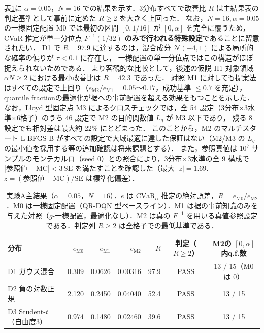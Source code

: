 \documentclass[a4paper,10pt]{jsarticle}
\theoremstyle{definition}
\newcommand{\CVaR}{\mathrm{CVaR}}
\newcommand{\Finv}{F^{-1}}
\begin{document}
表\ref{tab:A1}に $\alpha=0.05$，$N=16$ での結果を示す．3分布すべてで改善比 $R$ は主結果表の判定基準として事前に定めた $R\ge2$ を大きく上回った．
なお，$N=16, \alpha=0.05$ の一様固定配置 M0 では最初の区間 $[0, 1/16]$ が $[0, \alpha]$ を完全に覆うため，CVaR 推定が単一分位点 $\Finv(1/32)$ \textbf{のみで行われる特殊設定}であることに留意されたい．
D1 で $R=97.9$ に達するのは，混合成分 $\mathcal N(-4,1)$ による局所的な確率の偏りが $\tau<0.1$ に存在し，
一様配置の単一分位点ではこの構造がほぼ捉えられないためである．
より客観的な比較として，後述の仮説 H1 対象領域 $\alpha N\ge2$ における最小改善比は $R=42.3$ であった．
対照 M1 に対しても提案法はすべての設定で上回り（$e_{\mathrm{M2}}/e_{\mathrm{M1}}=0.05$〜$0.17$，成功基準 $\le0.7$ を充足），
quantile fractionの最適化が裾への事前配置を超える効果をもつことを示した．
なお，Lloyd 型固定点 M3 によるクロスチェックでは，全 54 設定（3分布$\times$3水準$\times$6格子）のうち 46 設定で M2 の目的関数値 $L_g$ が M3 以下であり，
残る 8 設定でも相対差は最大約 22\% にとどまった．
このことから，M2 のマルチスタート L-BFGS-B がすべての設定で大域最適に達した保証はない（M2/M3 の $L_g$ の最小値を採用する等の追加確認は将来課題とする）．
また，参照真値は $10^7$ サンプルのモンテカルロ（seed 0）との照合により，3分布$\times$3水準の全 9 構成で
$|\text{参照値}-\text{MC}|<3\,\mathrm{SE}$ を満たすことを確認した（最大 $|z|=1.69$. $z=(\text{参照値}-\text{MC})/\mathrm{SE}$ は標準化偏差）．

\begin{table}[htbp]
\centering
\caption{実験A主結果（$\alpha=0.05$，$N=16$）．$e$ は $\CVaR_\alpha$ 推定の絶対誤差，$R=e_{\mathrm{M0}}/e_{\mathrm{M2}}$．M0 は一様固定配置（QR-DQN 型ベースライン）．M1 は裾の事前知識のみを与えた対照（$g$-一様配置，最適化なし）．M2 は真の $\Finv$ を用いる真値参照設定である．判定列 $R\ge2$ は全格子での最低基準である．}
\label{tab:A1}
\small
\setlength{\tabcolsep}{5pt}
\begin{tabular}{lrrrrcc}
\toprule
分布 & $e_{\mathrm{M0}}$ & $e_{\mathrm{M1}}$ & $e_{\mathrm{M2}}$ & $R$ & 判定（$R\ge2$） & M2の $[0,\alpha]$ 内q.f.数\\
\midrule
D1 ガウス混合 & 0.309 & 0.0626 & 0.00316 & 97.9 & PASS & 13 / 15（M0 は 0）\\
D2 負の対数正規 & 2.120 & 0.2450 & 0.04040 & 52.4 & PASS & 13 / 15\\
D3 Student-$t$（自由度3） & 0.974 & 0.1480 & 0.02460 & 39.6 & PASS & 13 / 15\\
\bottomrule
\end{tabular}
\end{table}
\end{document}
